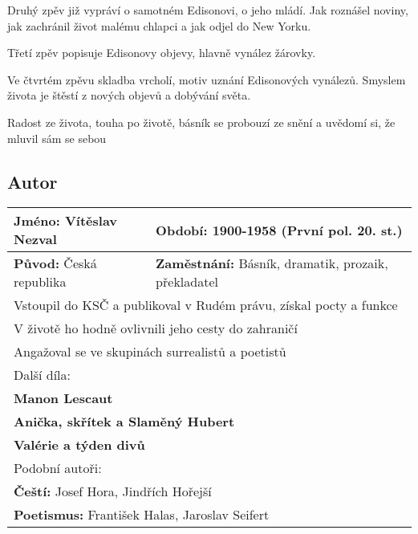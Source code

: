 Druhý zpěv již vypráví o samotném Edisonovi, o jeho mládí.
Jak roznášel noviny, jak zachránil život malému chlapci a jak odjel do New Yorku.

Třetí zpěv popisuje Edisonovy objevy, hlavně vynález žárovky.

Ve čtvrtém zpěvu skladba vrcholí, motiv uznání Edisonových vynálezů.
Smyslem života je štěstí z nových objevů a dobývání světa.

Radost ze života, touha po životě, básník se probouzí ze snění a uvědomí si, že mluvil sám se sebou
\subsection*{Autor}
\begin{tabularx}{\linewidth}{l|l}
    \textbf{Jméno:} Vítěslav Nezval & \textbf{Období:} 1900-1958 (První pol. 20. st.)             \\
    \hline
    \textbf{Původ:} Česká republika & \textbf{Zaměstnání:} Básník, dramatik, prozaik, překladatel \\
    \hline
    \multicolumn{2}{l}{Vstoupil do KSČ a publikoval v Rudém právu, získal pocty a funkce}         \\
    \multicolumn{2}{l}{V životě ho hodně ovlivnili jeho cesty do zahraničí}                       \\
    \multicolumn{2}{l}{Angažoval se ve skupinách surrealistů a poetistů}                          \\
    \hline
    \multicolumn{2}{l}{Další díla:}                                                               \\
    \multicolumn{2}{l}{\textbf{Manon Lescaut}}                                                    \\
    \multicolumn{2}{l}{\textbf{Anička, skřítek a Slaměný Hubert}}                                 \\
    \multicolumn{2}{l}{\textbf{Valérie a týden divů}}                                             \\
    \hline
    \multicolumn{2}{l}{Podobní autoři:}                                                           \\
    \multicolumn{2}{l}{\textbf{Čeští:} Josef Hora, Jindřích Hořejší}                              \\
    \multicolumn{2}{l}{\textbf{Poetismus:} František Halas, Jaroslav Seifert}                     \\
\end{tabularx}

